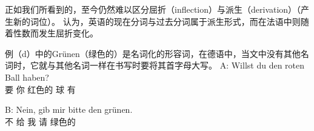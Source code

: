 
正如我们所看到的，至今仍然难以区分屈折（inflection）与派生（derivation）（产生新的词位）。 \citet*[--264]{SWB2003a}认为，英语的现在分词与过去分词属于派生形式，而在法语中则随着性数而发生屈折变化。

例（d）中的Grünen（绿色的）是名词化的形容词，在德语中，当文中没有其他名词时，它就与其他名词一样在书写时要将其首字母大写。
\ea
\gll A: Willst du den roten Ball haben?\\
	 {} 要 你  红色的 球 有\\
\glt {} 

\gll B: Nein, gib mir bitte den grünen.\\
	{} 不 给 我 请  绿色的\\
\glt {} 
\z

